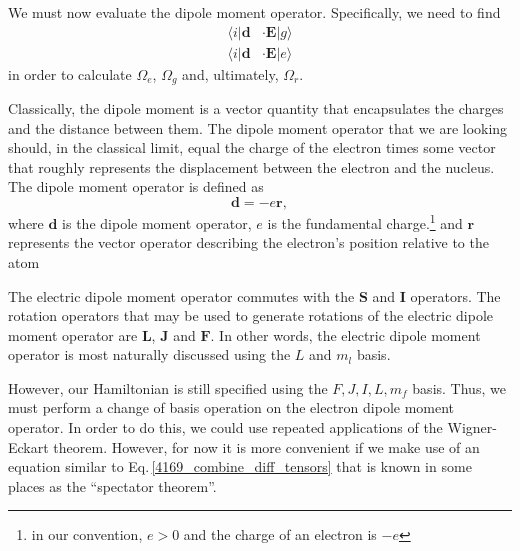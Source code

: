 We must now evaluate the dipole moment operator. Specifically, we need to find
\begin{align}
\langle i|\mathbf{d}&\cdot\mathbf{E}|g\rangle \\
\langle i|\mathbf{d}&\cdot\mathbf{E}|e\rangle
\end{align}
in order to calculate $\Omega_e$, $\Omega_g$ and, ultimately, $\Omega_r$.

Classically, the dipole moment is a vector quantity that encapsulates the charges and the distance between them. The dipole moment operator that we are looking should, in the classical limit, equal the charge of the electron times some vector that roughly represents the displacement between the electron and the nucleus. The dipole moment operator is defined as 
\begin{equation}
\mathbf{d}=-e\mathbf{r},
\end{equation}
where $\mathbf{d}$ is the dipole moment operator, $e$ is the fundamental charge.\footnote{in our convention, $e>0$ and the charge of an electron is $-e$} and $\mathbf{r}$ represents the vector operator describing the electron's position relative to the atom\cite{demilleBudkerKimball}

The electric dipole moment operator commutes with the $\mathbf{S}$ and $\mathbf{I}$ operators. The rotation operators that may be used to generate rotations of the electric dipole moment operator are $\mathbf{L}$, $\mathbf{J}$ and $\mathbf{F}$\cite{DeMille_presentation}. In other words, the electric dipole moment operator is most naturally discussed using the $L$ and $m_l$ basis. 

However,  our Hamiltonian is still specified using the $F, J, I, L, m_f$ basis. Thus,  we must perform a change of basis operation on the electron dipole moment operator. In order to do this,  we could use repeated applications of the Wigner-Eckart theorem.  
However, for now it is more convenient if we make use of an equation similar to Eq.\,\ref{4169_combine_diff_tensors} that is known in some places as the ``spectator theorem''\cite{DeMille_presentation}. %

